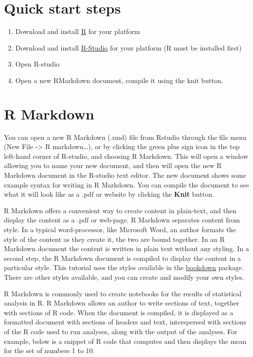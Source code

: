 \documentclass[]{book}
\providecommand{\tightlist}{%
  \setlength{\itemsep}{0pt}\setlength{\parskip}{0pt}}
\theoremstyle{definition}
\theoremstyle{definition}
\theoremstyle{definition}
\theoremstyle{remark}
\begin{document}
\section{Quick start steps}\label{quick-start-steps}

\begin{enumerate}
\def\labelenumi{\arabic{enumi}.}
\tightlist
\item
  Download and install \href{https://www.r-project.org}{R} for your
  platform
\item
  Download and install \href{https://www.rstudio.com}{R-Studio} for your
  platform (R must be installed first)
\item
  Open R-studio
\item
  Open a new RMarkdown document, compile it using the knit button.
\end{enumerate}

\section{R Markdown}\label{r-markdown}

You can open a new R Markdown (.rmd) file from Rstudio through the file
menu (New File -\textgreater{} R markdown\ldots{}), or by clicking the
green plus sign icon in the top left-hand corner of R-studio, and
choosing R Markdown. This will open a window allowing you to name your
new document, and then will open the new R Markdown document in the
R-studio text editor. The new document shows some example syntax for
writing in R Markdown. You can compile the document to see what it will
look like as a .pdf or website by clicking the \textbf{Knit} button.

R Markdown offers a convenient way to create content in plain-text, and
then display the content as a .pdf or web-page. R Markdown separates
content from style. In a typical word-processor, like Microsoft Word, an
author formats the style of the content as they create it, the two are
bound together. In an R Markdown document the content is written in
plain text without any styling. In a second step, the R Markdown
document is compiled to display the content in a particular style. This
tutorial uses the styles available in the
\href{https://bookdown.org/yihui/bookdown/}{bookdown} package. There are
other styles available, and you can create and modify your own styles.

R Markdown is commonly used to create notebooks for the results of
statistical analysis in R. R Markdown allows an author to write sections
of text, together with sections of R code. When the document is
compiled, it is displayed as a formatted document with sections of
headers and text, interspersed with sections of the R code used to run
analyses, along with the output of the analyses. For example, below is a
snippet of R code that computes and then displays the mean for the set
of numbers 1 to 10.
\end{document}
